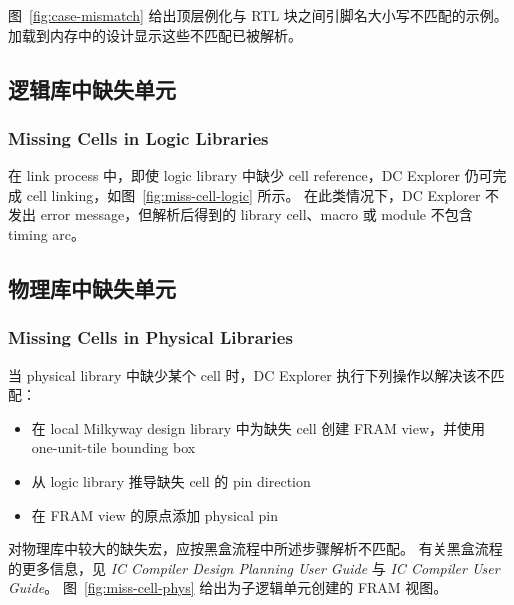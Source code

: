 图~\ref{fig:case-mismatch} 给出顶层例化与 RTL 块之间引脚名大小写不匹配的示例。加载到内存中的设计显示这些不匹配已被解析。


\subsection{逻辑库中缺失单元}
\subsubsection*{Missing Cells in Logic Libraries}

在 link process 中，即使 logic library 中缺少 cell reference，DC Explorer 仍可完成 cell linking，如图~\ref{fig:miss-cell-logic} 所示。
在此类情况下，DC Explorer 不发出 error message，但解析后得到的 library cell、macro 或 module 不包含 timing arc。


\subsection{物理库中缺失单元}
\subsubsection*{Missing Cells in Physical Libraries}

当 physical library 中缺少某个 cell 时，DC Explorer 执行下列操作以解决该不匹配：
\begin{itemize}
  \item 在 local Milkyway design library 中为缺失 cell 创建 FRAM view，并使用 one-unit-tile bounding box
  \item 从 logic library 推导缺失 cell 的 pin direction
  \item 在 FRAM view 的原点添加 physical pin
\end{itemize}

对物理库中较大的缺失宏，应按黑盒流程中所述步骤解析不匹配。
有关黑盒流程的更多信息，见 \textit{IC Compiler Design Planning User Guide} 与 \textit{IC Compiler User Guide}。
图~\ref{fig:miss-cell-phys} 给出为子逻辑单元创建的 FRAM 视图。


